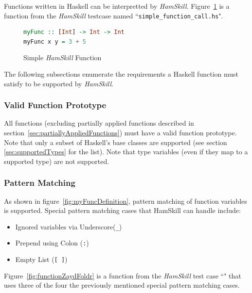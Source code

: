 \documentclass{report}
\begin{document}
Functions written in Haskell can be interpretted by \textit{HamSkill}.  Figure~\ref{fig:myFunctionHaskell} is a function from the \textit{HamSkill} testcase named ``\texttt{simple\_function\_call.hs}".

\begin{figure}[H]
\begin{mdframed}
\begin{lstlisting}[language=Haskell]
myFunc :: [Int] -> Int -> Int
myFunc x y = 3 + 5
\end{lstlisting}
\end{mdframed}
\caption{Simple \textit{HamSkill} Function}\label{fig:myFunctionHaskell}
\end{figure}

The following subsections enumerate the requirements a Haskell function must satisfy to be supported by \textit{HamSkill}.

\subsubsection{Valid Function Prototype}

All functions (excluding partially applied functions described in section~\ref{sec:partiallyAppliedFunctions}) must have a valid function prototype.  Note that only a subset of Haskell's base classes are supported (see section \ref{sec:supportedTypes} for the list).  Note that type variables (even if they map to a supported type) are not supported.

\subsubsection{Pattern Matching}\label{sec:supportedPatternMatching}

As shown in figure~\ref{fig:myFuncDefinition}, pattern matching of function variables is supported.  Special pattern matching cases that HamSkill can handle include:

\begin{itemize}

\item Ignored variables via Underscore(\texttt{\_})

\item Prepend using Colon (\texttt{:})

\item Empty List (\texttt{[ ]})

\end{itemize}

Figure~\ref{fig:functionZaydFoldr} is a function from the \textit{HamSkill} test case ``" that uses three of the four the previously mentioned special pattern matching cases.
\end{document}

